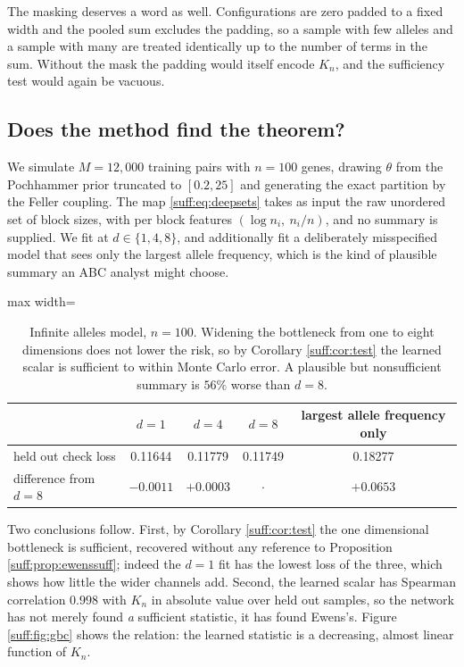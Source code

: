 The masking deserves a word as well. Configurations are zero padded to a fixed width and the
pooled sum excludes the padding, so a sample with few alleles and a sample with many are
treated identically up to the number of terms in the sum. Without the mask the padding would
itself encode $K_n$, and the sufficiency test would again be vacuous.

\subsection{Does the method find the theorem?}

We simulate $M=12{,}000$ training pairs with $n=100$ genes, drawing $\theta$ from the
Pochhammer prior truncated to $[0.2,25]$ and generating the exact partition by the Feller
coupling. The map \eqref{suff:eq:deepsets} takes as input the raw unordered set of block
sizes, with per block features $(\log n_i,\ n_i/n)$, and no summary is supplied. We fit at
$d\in\{1,4,8\}$, and additionally fit a deliberately misspecified model that sees only the
largest allele frequency, which is the kind of plausible summary an ABC analyst might choose.

\begin{table}[t]
\centering
\begin{adjustbox}{max width=\textwidth}
\begin{tabular}{lcccc}
\toprule
& $d=1$ & $d=4$ & $d=8$ & largest allele frequency only \\
\midrule
held out check loss & 0.11644 & 0.11779 & 0.11749 & 0.18277 \\
difference from $d=8$   & $-0.0011$ & $+0.0003$ & $\cdot$ & $+0.0653$ \\
\bottomrule
\end{tabular}
\end{adjustbox}
\caption{Infinite alleles model, $n=100$. Widening the bottleneck from one to eight
dimensions does not lower the risk, so by Corollary \ref{suff:cor:test} the learned scalar
is sufficient to within Monte Carlo error. A plausible but nonsufficient summary is $56\%$
worse than $d=8$.}
\label{suff:tab:esf}
\end{table}

Two conclusions follow. First, by Corollary \ref{suff:cor:test} the one dimensional
bottleneck is sufficient, recovered without any reference to Proposition
\ref{suff:prop:ewenssuff}; indeed the $d=1$ fit has the lowest loss of the three, which shows
how little the wider channels add. Second, the learned scalar has Spearman correlation
$0.998$ with $K_n$ in absolute value over held out samples, so the network has not merely found \emph{a}
sufficient statistic, it has found Ewens's. Figure \ref{suff:fig:gbc} shows the relation:
the learned statistic is a decreasing, almost linear function of $K_n$.

